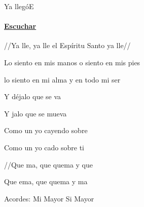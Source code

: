 \documentclass[12pt, spanish]{book}
\begin{document}
    \begin{song}{Ya llegó}{E}
        {} %
        {}
        {} %
        {}
        \ifChordBk
            \paragraph{\mbox{}\hfill\protect\href{https://open.spotify.com/intl-es/track/6KzloQ7OS1IDOqDYR9lQuX}{Escuchar}\mbox{}\hfill}
        \fi

        \begin{SBOpGroup}
            //Ya lle, ya lle el Espíritu Santo ya lle//

            Lo siento en mis manos o siento en mis pies

            lo siento en mi alma y en todo mi ser
        \end{SBOpGroup}

        \begin{SBOpGroup}
            Y déjalo que se va

            Y jalo que se mueva
        \end{SBOpGroup}

        \begin{SBOpGroup}
            Como un yo cayendo sobre 

            Como un yo cado sobre ti

            //Que ma, que quema y que

            Que ema, que quema y ma
        \end{SBOpGroup}

        \ifChordBk
        \begin{SBOpGroup}
            Acordes:
            \upchord{\E}\qquad Mi Mayor \hfill
            \upchord{\B}\qquad Si Mayor \hfill\null\break
        \end{SBOpGroup}
        \fi
    \end{song}
\end{document}
